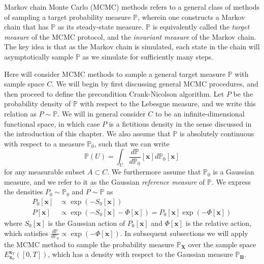 Markov chain Monte Carlo (MCMC) methods refers to a general class of methods of sampling a target probability measure $\mathbb{P}$, wherein one constructs a Markov chain that has $\mathbb{P}$ as its steady-state measure. $\mathbb{P}$ is equivalently called the \textit{target measure} of the MCMC protocol, and the \textit{invariant measure} of the Markov chain. The key idea is that as the Markov chain is simulated, each state in the chain will asymptotically sample $\mathbb{P}$ as we simulate for sufficiently many steps.

Here will consider MCMC methods to sample a general target measure $\mathbb{P}$ with sample space $C$. We will begin by first discussing general MCMC procedures, and then proceed to define the precondition Crank-Nicolson algorithm. Let $P$ be the probability density of $\mathbb{P}$ with respect to the Lebesgue measure, and we write this relation as $P \sim \mathbb{P}$. We will in general consider $C$ to be an infinite-dimensional functional space, in which case $P$ is a fictitious density in the sense discussed in the introduction of this chapter. We also assume that $\mathbb{P}$ is absolutely continuous with respect to a measure $\mathbb{P}_0$, such that we can write
\begin{equation} 
	\mathbb{P}(U) = \int_U \frac{d \mathbb{P}}{d \mathbb{P}_0}[\mathbf{x}] d \mathbb{P}_0[\mathbf{x}]
\end{equation}
for any measurable subset $A \subset C$. We furthermore assume that $\mathbb{P}_0$ is a Gaussian measure, and we refer to it as the Gaussian \textit{reference measure} of $\mathbb{P}$. We express the densities $P_0 \sim \mathbb{P}_0$ and $P \sim \mathbb{P}$ as
\begin{subequations}
\begin{align}
	P_0[\mathbf{x}] & \propto \exp ( -S_0[\mathbf{x}] ) \\
	P[\mathbf{x}] & \propto \exp (  -S_0[\mathbf{x}] - \Phi[\mathbf{x}] ) = P_0[\mathbf{x}] \exp ( - \Phi[\mathbf{x}] )
\end{align}
\end{subequations}
where $S_0[\mathbf{x}]$ is the Gaussian action of $P_0[\mathbf{x}]$ and $\Phi[\mathbf{x}]$ is the relative action, which satisfies $\frac{d \mathbb{P}}{d \mathbb{P}_0} \propto \exp( - \Phi[\mathbf{x}] )$. In subsequent subsections we will apply the MCMC method to sample the probability measure $\mathbb{P}_\mathbf{X}$ over the sample space $E_{\mathbf{x}_0}^{\mathbf{x}_T}([0,T])$, which has a density with respect to the Gaussian measure $\mathbb{P}_\mathbf{B}$.

